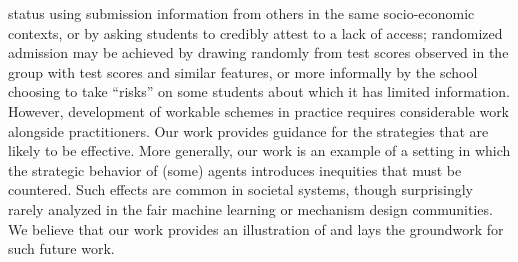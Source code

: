 \documentclass[10pt]{article}
\begin{document}
\begin{ReviewVerbatim}
status using submission information from others in the same socio-economic contexts, or by asking
students to credibly attest to a lack of access; randomized admission may be achieved by drawing
randomly from test scores observed in the group with test scores and similar features, or more
informally by the school choosing to take “risks” on some students about which it has limited
information. However, development of workable schemes in practice requires considerable work
alongside practitioners. Our work provides guidance for the strategies that are likely to be eﬀective.
More generally, our work is an example of a setting in which the strategic behavior of (some)
agents introduces inequities that must be countered. Such eﬀects are common in societal systems,
though surprisingly rarely analyzed in the fair machine learning or mechanism design communities.
We believe that our work provides an illustration of and lays the groundwork for such future work.
\end{ReviewVerbatim}
\end{document}
